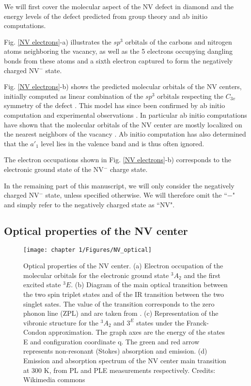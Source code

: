 \documentclass[a4paper, 11pt]{book}
\begin{document}
We will first cover the molecular aspect of the NV defect in diamond and the energy levels of the defect predicted from group theory and ab initio computations.

Fig. \ref{NV electrons}-a) illustrates the $sp^3$ orbitals of the carbons and nitrogen atoms neighboring the vacancy, as well as the 5 electrons occupying dangling bonds from these atoms and a sixth electron captured to form the negatively charged NV$^-$ state. 

Fig. \ref{NV electrons}-b) shows the predicted molecular orbitals of the NV centers, initially computed as linear combination of the $sp^3$ orbitals respecting the $C_{3v}$ symmetry of the defect \citep{loubser1978electron}. This model has since been confirmed by ab initio computation and experimental observations \citep{doherty2013nitrogen}. In particular ab initio computations have shown that the molecular orbitals of the NV center are mostly localized on the nearest neighbors of the vacancy \citep{gali2008ab}. Ab initio computation has also determined that the $a'_1$ level lies in the valence band and is thus often ignored.

The electron occupations shown in Fig. \ref{NV electrons}-b) corresponds to the electronic ground state of the NV$^-$ charge state.

In the remaining part of this manuscript, we will only consider the negatively charged NV$^-$ state, unless specified otherwise. We will therefore omit the ``$-$" and simply refer to the negatively charged state as ``NV".
\subsection{Optical properties of the NV center}
\begin{figure}[h!]
\centering
\texttt{[image: chapter 1/Figures/NV\_optical]}
\caption{Optical properties of the NV center. (a) Electron occupation of the molecular orbitals for the electronic ground state $^3A_2$ and the first excited state $^3E$. (b) Diagram of the main optical transition between the two spin triplet states and of the IR transition between the two singlet sates. The value of the transition corresponds to the zero phonon line (ZPL) and are taken from \citep{doherty2013nitrogen}. (c) Representation of the vibronic structure for the $^3A_2$ and $3^E$ states under the Franck-Condon approximation. The graph axes are the energy of the states E and configuration coordinate q. The green and red arrow represents non-resonant (Stokes) absorption and emission. (d) Emission and absorption spectrum of the NV center main transition at 300 K, from PL and PLE measurements respectively. Credits: Wikimedia commons}
\label{NV optical}
\end{figure}
\end{document}
